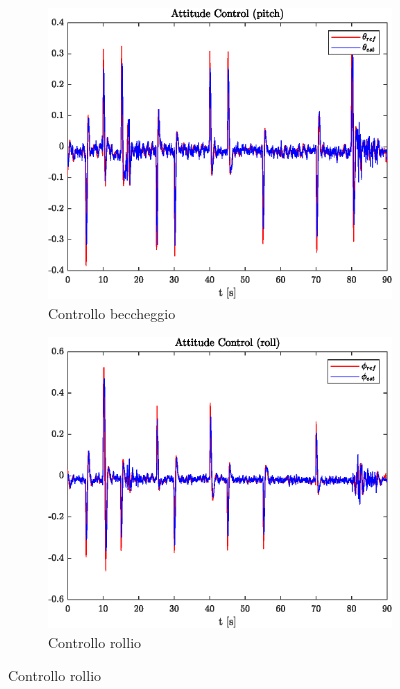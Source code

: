 \begin{figure}
	\centering
	\begin{subfigure}{0.45\textwidth}
		\centering
		\includegraphics[width=1\textwidth]{Simulazioni/Figure/SMC/SNAKE/AttitudeControlPitch}
		\caption{Controllo beccheggio}
	\end{subfigure}
	\hfill
	\begin{subfigure}{0.45\textwidth}
		\centering
		\includegraphics[width=1\textwidth]{Simulazioni/Figure/SMC/SNAKE/AttitudeControlRoll}
		\caption{Controllo rollio}

\end{subfigure}
\end{figure}
